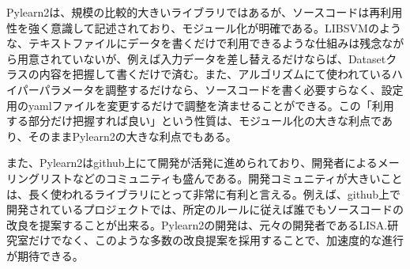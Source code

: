 Pylearn2は、規模の比較的大きいライブラリではあるが、ソースコードは再利用性を強く意識して記述されており、モジュール化が明確である。LIBSVMのような、テキストファイルにデータを書くだけで利用できるような仕組みは残念ながら用意されていないが、例えば入力データを差し替えるだけならば、Datasetクラスの内容を把握して書くだけで済む。また、アルゴリズムにて使われているハイパーパラメータを調整するだけなら、ソースコードを書く必要すらなく、設定用のyamlファイルを変更するだけで調整を済ませることができる。この「利用する部分だけ把握すれば良い」という性質は、モジュール化の大きな利点であり、そのままPylearn2の大きな利点でもある。\par
また、Pylearn2はgithub上にて開発が活発に進められており、開発者によるメーリングリストなどのコミュニティも盛んである。開発コミュニティが大きいことは、長く使われるライブラリにとって非常に有利と言える。例えば、github上で開発されているプロジェクトでは、所定のルールに従えば誰でもソースコードの改良を提案することが出来る。Pylearn2の開発は、元々の開発者であるLISA.研究室だけでなく、このような多数の改良提案を採用することで、加速度的な進行が期待できる。